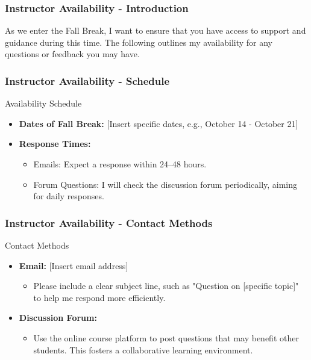 \documentclass[aspectratio=169]{beamer}
\begin{document}
\begin{frame}[fragile]
    \frametitle{Instructor Availability - Introduction}
    As we enter the Fall Break, I want to ensure that you have access to support and guidance during this time. The following outlines my availability for any questions or feedback you may have.
\end{frame}

\begin{frame}[fragile]
    \frametitle{Instructor Availability - Schedule}
    \begin{block}{Availability Schedule}
        \begin{itemize}
            \item \textbf{Dates of Fall Break:} [Insert specific dates, e.g., October 14 - October 21]
            \item \textbf{Response Times:}
            \begin{itemize}
                \item Emails: Expect a response within 24–48 hours.
                \item Forum Questions: I will check the discussion forum periodically, aiming for daily responses.
            \end{itemize}
        \end{itemize}
    \end{block}
\end{frame}

\begin{frame}[fragile]
    \frametitle{Instructor Availability - Contact Methods}
    \begin{block}{Contact Methods}
        \begin{itemize}
            \item \textbf{Email:} [Insert email address] 
            \begin{itemize}
                \item Please include a clear subject line, such as "Question on [specific topic]" to help me respond more efficiently.
            \end{itemize}
            \item \textbf{Discussion Forum:}
            \begin{itemize}
                \item Use the online course platform to post questions that may benefit other students. This fosters a collaborative learning environment.
            \end{itemize}
        \end{itemize}
    \end{block}
\end{frame}
\end{document}
